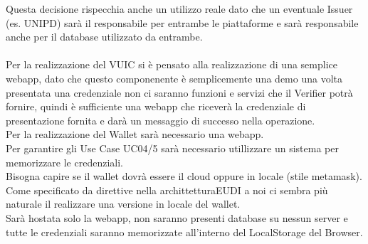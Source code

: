 Questa decisione rispecchia anche un utilizzo reale dato che un eventuale Issuer (es. UNIPD) sarà il responsabile
per entrambe le piattaforme e sarà responsabile anche per il database utilizzato da entrambe.\\
\\
Per la realizzazione del VUIC si è pensato alla realizzazione di una semplice webapp, dato che questo componenente è semplicemente una demo una volta presentata una credenziale
non ci saranno funzioni e servizi che il Verifier potrà fornire, quindi è sufficiente una webapp che riceverà la credenziale di presentazione fornita e darà un messaggio di successo nella operazione.
\\
Per la realizzazione del Wallet sarà necessario una webapp.\\
Per garantire gli Use Case UC04/5 sarà necessario utillizzare un sistema per memorizzare le credenziali.\\
Bisogna capire se il wallet dovrà essere il cloud oppure in locale (stile metamask).\\
Come specificato da direttive nella archittetturaEUDI a noi ci sembra più naturale il realizzare una versione in locale del wallet.\\
Sarà hostata solo la webapp, non saranno presenti database su nessun server e tutte le credenziali saranno memorizzate all'interno del LocalStorage del Browser.\\


